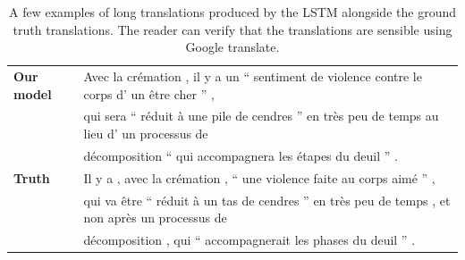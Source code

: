 \begin{table}[ht!]
\begin{footnotesize}
\begin{tabular}{|l|l|}
\hline\hline
{\bf Our model} & 
Avec la cr\'{e}mation , il y a un `` sentiment de violence contre le corps d' un \^{e}tre cher '' , \\
& qui sera `` r\'{e}duit \`{a} une pile de cendres '' en tr\`{e}s peu de temps au lieu d' un processus de \\
& d\'{e}composition ``  qui accompagnera les \'{e}tapes du deuil '' .\\
\hline
{\bf Truth} & 
Il y a , avec la cr\'{e}mation , `` une violence faite au corps aim\'{e} '' , \\
& qui va \^{e}tre `` r\'{e}duit \`{a} un tas de cendres '' en tr\`{e}s peu de temps , et non apr\`{e}s un processus de \\
&d\'{e}composition , qui `` accompagnerait les phases du deuil '' .\\
\hline
\end{tabular}
\end{footnotesize}
\caption{A few examples of long translations produced by the LSTM
  alongside the ground truth translations.  The reader can verify that
  the translations are sensible using Google translate.  }
\label{tab:examples}
\end{table}



